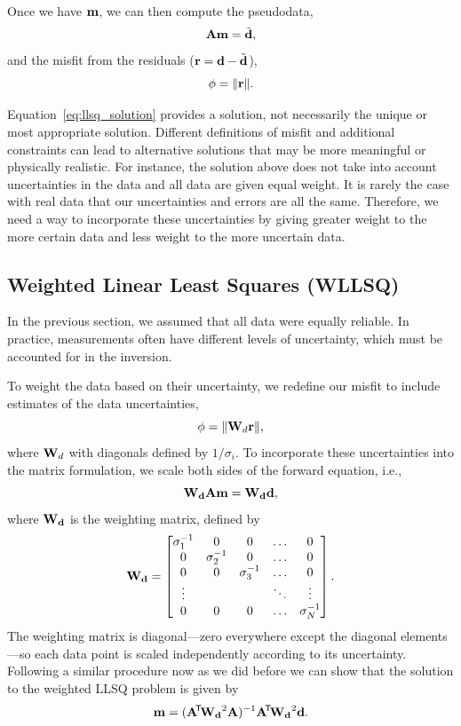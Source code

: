 Once we have $\vb{m}$, we can then compute the pseudodata,
\[
    \vb{A} \vb{m} = \tilde{\vb{d}},
\]
and the misfit from the residuals ($\vb{r} = \vb{d} - \tilde{\vb{d}}$),
\[
    \phi = \norm{\vb{r}} .
\]

Equation~\ref{eq:llsq_solution} provides a solution, not necessarily the unique or most appropriate solution.  Different definitions of misfit and additional constraints can lead to alternative solutions that may be more meaningful or physically realistic.  For instance, the solution above does not take into account uncertainties in the data and all data are given equal weight.  It is rarely the case with real data that our uncertainties and errors are all the same.  Therefore, we need a way to incorporate these uncertainties by giving greater weight to the more certain data and less weight to the more uncertain data.

\subsection{Weighted Linear Least Squares (WLLSQ)}

In the previous section, we assumed that all data were equally reliable. In practice, measurements often have different levels of uncertainty, which must be accounted for in the inversion.

To weight the data based on their uncertainty, we redefine our misfit to include estimates of the data uncertainties,
\begin{equation}
    \phi = \norm{\vb{W}_d \vb{r}} ,
\end{equation}
where $\vb{W}_d$ with diagonals defined by $1/\sigma_i$.  To incorporate these uncertainties into the matrix formulation, we scale both sides of the forward equation, i.e.,
\begin{equation}
    \vb{W_d} \vb{A} \vb{m} = \vb{W_d} \vb{d} ,
\end{equation}
where $\vb{W_d}$ is the weighting matrix, defined by
\begin{equation}
    \vb{W_d} =
    \begin{bmatrix}
        \sigma_1^{-1} & 0 & 0 & \dots & 0 \\
        0 & \sigma_2^{-1} & 0 & \dots & 0 \\
        0 & 0 & \sigma_3^{-1} & \dots & 0 \\
        \vdots & & & \ddots & \vdots \\
        0 & 0 & 0 & \dots & \sigma_N^{-1} \\
    \end{bmatrix} .
\end{equation}
The weighting matrix is diagonal---zero everywhere except the diagonal elements---so each data point is scaled independently according to its uncertainty.  Following a similar procedure now as we did before we can show that the solution to the weighted LLSQ problem is given by
\begin{equation}
    \vb{m} = (\vb{A}\!^\mathsf{T}\! \vb{W_d}^2 \vb{A})^{-1} \vb{A}\!^\mathsf{T}\! \vb{W_d}^2 \vb{d} .
\end{equation}

